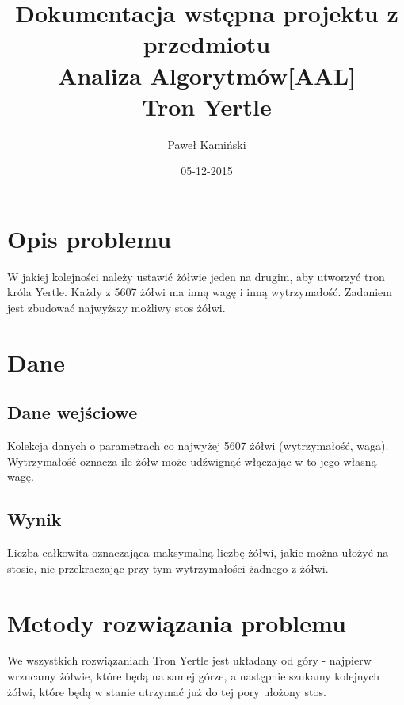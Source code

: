 \documentclass[11pt,a4paper]{article}
\title{Dokumentacja wstępna projektu z przedmiotu\\Analiza Algorytmów[AAL]\\Tron Yertle}
\author{Paweł Kamiński}
\date{05-12-2015}
\begin{document}
\maketitle
\section{Opis problemu}

W jakiej kolejności należy ustawić żółwie jeden na drugim, aby utworzyć tron króla Yertle. Każdy z 5607 żółwi ma inną wagę i inną wytrzymałość. Zadaniem jest zbudować najwyższy możliwy stos żółwi.

\section{Dane}

\subsection{Dane wejściowe} Kolekcja danych o parametrach co najwyżej 5607 żółwi (wytrzymałość, waga). Wytrzymałość oznacza ile żółw może udźwignąć włączając w to jego własną wagę.

\subsection{Wynik}
Liczba całkowita oznaczająca maksymalną liczbę żółwi, jakie można ułożyć na stosie, nie przekraczając przy tym wytrzymałości żadnego z żółwi.

\section{Metody rozwiązania problemu}
We wszystkich rozwiązaniach Tron Yertle jest układany od góry - najpierw wrzucamy żółwie, które będą na samej górze, a następnie szukamy kolejnych żółwi, które będą w stanie utrzymać już do tej pory ułożony stos.
\end{document}

